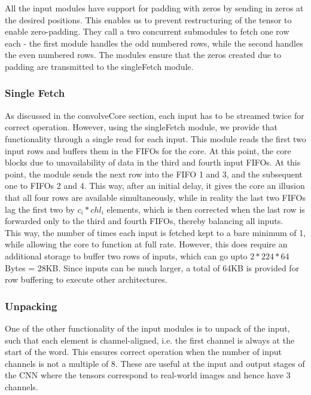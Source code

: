 \documentclass[a4paper,12pt, final]{report}
\begin{document}
All the input modules have support for padding with zeros by sending in zeros at the desired positions. This enables us to prevent restructuring of the tensor to enable zero-padding. They call a two concurrent submodules to fetch one row each - the first module handles the odd numbered rows, while the second handles the even numbered rows. The modules ensure that the zeros created due to padding are transmitted to the singleFetch module.

\subsubsection{Single Fetch}

As discussed in the convolveCore section, each input has to be streamed twice for correct operation. However, using the singleFetch module, we provide that functionality through a single read for each input. This module reads the first two input rows and buffers them in the FIFOs for the core. At this point, the core blocks due to unavailability of data in the third and fourth input FIFOs. At this point, the module sends the next row into the FIFO 1 and 3, and the subsequent one to FIFOs 2 and 4. This way, after an initial delay, it gives the core an illusion that all four rows are available simultaneously, while in reality the last two FIFOs lag the first two by $c_i*chl_i$ elements, which is then corrected when the last row is forwarded only to the third and fourth FIFOs, thereby balancing all inputs.
\\

This way, the number of times each input is fetched kept to a bare minimum of 1, while allowing the core to function at full rate. However, this does require an additional storage to buffer two rows of inputs, which can go upto $2*224*64$ Bytes = 28KB. Since inputs can be much larger, a total of 64KB is provided for row buffering to execute other architectures.

\subsubsection{Unpacking}

One of the other functionality of the input modules is to unpack of the input, such that each element is channel-aligned, i.e. the first channel is always at the start of the word. This ensures correct operation when the number of input channels is not a multiple of 8. These are useful at the input and output stages of the CNN where the tensors correspond to real-world images and hence have 3 channels.
\end{document}
